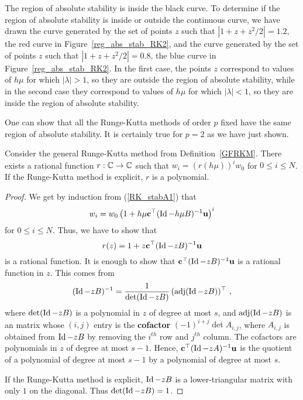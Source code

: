 \begin{egg}
The region of absolute stability is inside the black curve.
To determine if the region of absolute stability is inside or outside
the continuous curve, we have drawn the curve generated
by the set of points $z$ such that
$\left| 1 + z + z^2/2 \right| = 1.2$, the red curve in
Figure~\ref{reg_abs_stab_RK2}, and the curve generated by the set of
points $z$ such that $\left| 1 + z + z^2/2 \right| = 0.8$, the blue
curve in Figure~\ref{reg_abs_stab_RK2}.  In the first case, the points
$z$ correspond to values of $h\mu$ for which
$| \lambda | > 1$, so they are outside the region of absolute
stability, while in the second case they correspond to values 
of $h\mu$ for which $| \lambda | < 1$, so they are inside the
region of absolute stability.

One can show that all the Runge-Kutta methods of order $p$ fixed
have the same region of absolute stability.  It is certainly true for
$p=2$ as we have just shown.
\end{egg}


\begin{prop}
Consider the general Runge-Kutta method from Definition~\ref{GFRKM}.
There exists a rational function $r:\mathbb{C} \to \mathbb{C}$ such that
$\displaystyle w_i = (r(h\mu))^i w_0$ for $0 \leq i \leq N$.
If the Runge-Kutta method is explicit, $r$ is a polynomial.
\label{rat_funct}
\end{prop}

\begin{proof}
We get by induction from (\ref{RK_stabA1}) that
\[
w_i = w_0\left(1 + h\mu \mathbf{c}^\top(\operatorname{Id}-h\mu B)^{-1}\mathbf{u} \right)^i
\]
for $0\leq i \leq N$.  Thus, we have to show that
\[
r(z) = 1 + z\mathbf{c}^\top (\operatorname{Id} - zB)^{-1} \mathbf{u}
\]
is a rational function.
It is enough to show that $\mathbf{c}^\top(\operatorname{Id}-zB)^{-1}\mathbf{u}$ is a
rational function in $z$.  This comes from
\[
(\operatorname{Id}-zB)^{-1} = \frac{1}{\det(\operatorname{Id}-zB)}\,(\text{adj}(\operatorname{Id}-zB))^\top \ ,
\]
where $\det(\operatorname{Id}-zB)$ is a polynomial in $z$ of degree at most $s$, and
$\text{adj}(\operatorname{Id}-zB)$ is an  matrix whose $(i,j)$ entry is
the {\bfseries cofactor} $(-1)^{i+j} \det A_{i,j}$, where $A_{i,j}$ is
obtained from $\operatorname{Id} - zB$ by removing the $i^{th}$ row and $j^{th}$ column.
The cofactors are polynomials in $z$ of degree at most $s-1$.
Hence, $\mathbf{c}^\top(\operatorname{Id}-zA)^{-1}\mathbf{u}$ is the quotient
of a polynomial of degree at most $s-1$ by a polynomial of degree at
most $s$.

If the Runge-Kutta method is explicit, $\operatorname{Id}-zB$ is a lower-triangular
matrix with only $1$ on the diagonal.  Thus $\det(\operatorname{Id}-zB) =1$.
\end{proof}

